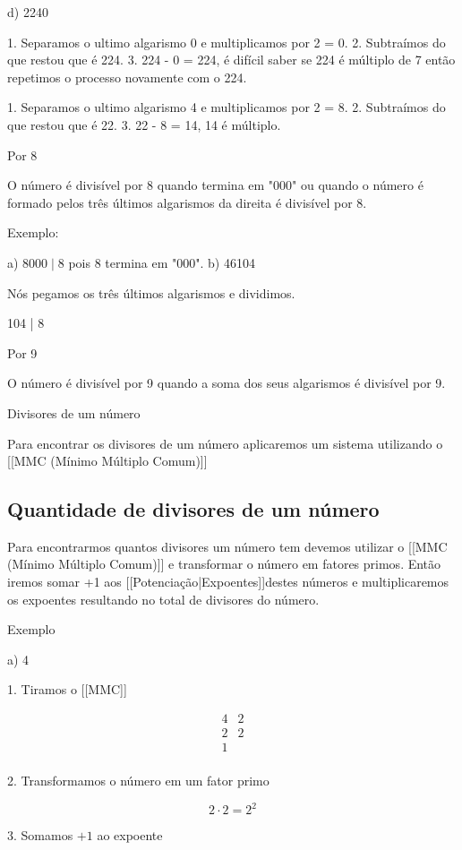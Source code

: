 \documentclass[letterpaper]{book}
\begin{document}
d) 2240

1. Separamos o ultimo algarismo 0 e multiplicamos por 2 = 0.
2. Subtraímos do que restou que é 224.
3. 224 - 0 = 224, é difícil saber se 224 é múltiplo de 7 então repetimos o processo novamente com o 224.

1. Separamos o ultimo algarismo 4 e multiplicamos por 2 = 8.
2. Subtraímos do que restou que é 22.
3. 22 - 8 = 14, 14 é múltiplo.

Por 8

O número é divisível por 8 quando termina em "000" ou quando o número é formado pelos três últimos algarismos da direita é divisível por 8.

Exemplo:

a) \(8000 \mid 8\) pois 8 termina em "000".
b) 46104 

Nós pegamos os três últimos algarismos e dividimos.


104 | 8

Por 9

O número é divisível por 9 quando a soma dos seus algarismos é divisível por 9.

Divisores de um número 

Para encontrar os divisores de um número aplicaremos um sistema utilizando o [[MMC (Mínimo Múltiplo Comum)]]

\subsection{Quantidade de divisores de um número}

Para encontrarmos quantos divisores um número tem devemos utilizar o [[MMC (Mínimo Múltiplo Comum)]] e transformar o número em fatores primos. Então iremos somar +1 aos [[Potenciação|Expoentes]]destes números e multiplicaremos os expoentes resultando no total de divisores do número.

Exemplo

a) 4 

1. Tiramos o [[MMC]]

\[
\begin{array}{c|ccc}
4 & 2 \\
2 & 2 \\
1 &   \\
\end{array}
\]

2. Transformamos o número em um fator primo

\[2 \cdot 2 = 2^{2}\]

3. Somamos \(+1\) ao expoente
\end{document}
